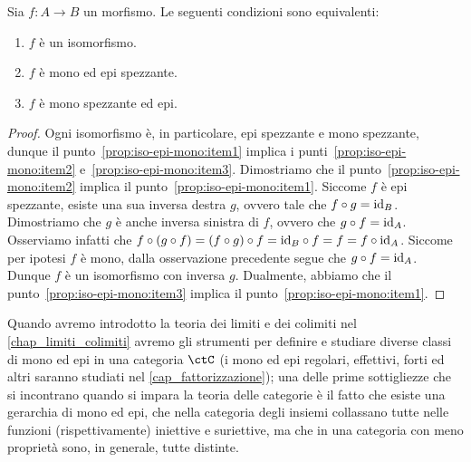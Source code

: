 \begin{proposition}\label{prop:iso-epi-mono}
	Sia \(f \colon A \to B\) un morfismo. Le seguenti condizioni sono equivalenti:
	\begin{enumerate}
		\item\label{prop:iso-epi-mono:item1} \(f\) \`e un isomorfismo.
		\item\label{prop:iso-epi-mono:item2} \(f\) \`e mono ed epi spezzante.
		\item\label{prop:iso-epi-mono:item3} \(f\) \`e mono spezzante ed epi.
	\end{enumerate}
\end{proposition}
\begin{proof}
	Ogni isomorfismo \`e, in particolare, epi spezzante e mono spezzante, dunque il punto~\ref{prop:iso-epi-mono:item1} implica i punti~\ref{prop:iso-epi-mono:item2} e~\ref{prop:iso-epi-mono:item3}.
	Dimostriamo che il punto~\ref{prop:iso-epi-mono:item2} implica il punto~\ref{prop:iso-epi-mono:item1}.
	Siccome \(f\) \`e epi spezzante, esiste una sua inversa destra \(g\), ovvero tale che \(f \circ g = \mathrm{id}_{B}\).
	Dimostriamo che \(g\) \`e anche inversa sinistra di \(f\), ovvero che \(g \circ f = \mathrm{id}_{A}\).
	Osserviamo infatti che \(f \circ (g \circ f) = (f \circ g) \circ f = \mathrm{id}_{B} \circ f = f = f \circ \mathrm{id}_{A}\).
	Siccome per ipotesi \(f\) \`e mono, dalla osservazione precedente segue che \(g \circ f = \mathrm{id}_{A}\).
	Dunque \(f\) \`e un isomorfismo con inversa \(g\).
	Dualmente, abbiamo che il punto~\ref{prop:iso-epi-mono:item3} implica il punto~\ref{prop:iso-epi-mono:item1}.
\end{proof}
Quando avremo introdotto la teoria dei limiti e dei colimiti nel \autoref{chap_limiti_colimiti} avremo gli strumenti per definire e studiare diverse classi di mono ed epi in una categoria \(\ctC\) (i mono ed epi regolari, effettivi, forti ed altri saranno studiati nel \autoref{cap_fattorizzazione}); una delle prime sottigliezze che si incontrano quando si impara la teoria delle categorie è il fatto che esiste una gerarchia di mono ed epi, che nella categoria degli insiemi collassano tutte nelle funzioni (rispettivamente) iniettive e suriettive, ma che in una categoria con meno proprietà sono, in generale, tutte distinte.

